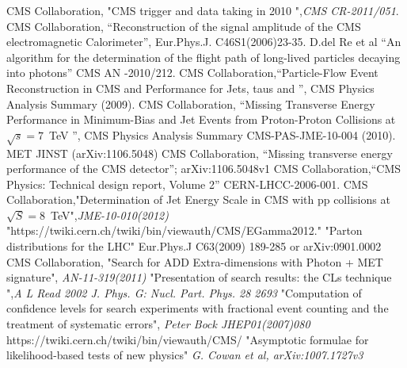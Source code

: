 \begin{thebibliography}{9}
CMS Collaboration, "CMS trigger and data taking in 2010 ",\emph{CMS CR-2011/051}.
CMS Collaboration, ``Reconstruction of the signal amplitude of the CMS electromagnetic Calorimeter'', Eur.Phys.J. C46S1(2006)23-35.
 D.del Re et al ``An algorithm for the determination of the flight path of long-lived particles decaying into photons'' CMS AN -2010/212.
CMS Collaboration,``Particle-Flow Event Reconstruction in CMS and Performance for Jets, taus and \ETslash'', CMS Physics Analysis Summary (2009).
CMS Collaboration, “Missing Transverse Energy Performance in Minimum-Bias and Jet Events from Proton-Proton Collisions at $\sqrt{s} =7$~TeV ”, CMS Physics Analysis Summary CMS-PAS-JME-10-004 (2010).
MET JINST (arXiv:1106.5048)
CMS Collaboration, ``Missing transverse energy performance of the CMS detector''; arXiv:1106.5048v1
CMS Collaboration,``CMS Physics: Technical design report, Volume 2'' CERN-LHCC-2006-001.
 CMS Collaboration,"Determination of Jet Energy Scale in CMS with pp collisions at $\sqrt{S} = 8$~TeV",\textit{JME-10-010(2012)}
 "https://twiki.cern.ch/twiki/bin/viewauth/CMS/EGamma2012."
 "Parton distributions for the LHC" Eur.Phys.J C63(2009) 189-285 or arXiv:0901.0002
 CMS Collaboration, "Search for ADD Extra-dimensions with Photon + MET signature", \textit{AN-11-319(2011)}
 "Presentation of search results: the CLs technique ",\textit{A L Read 2002 J. Phys. G: Nucl. Part. Phys. 28 2693}
 "Computation of confidence levels for search experiments with fractional event counting and the treatment of systematic errors", \textit{Peter Bock JHEP01(2007)080}
 https://twiki.cern.ch/twiki/bin/viewauth/CMS/
  "Asymptotic formulae for likelihood-based tests of new physics" \textit{G. Cowan et al, arXiv:1007.1727v3}

\end{thebibliography}